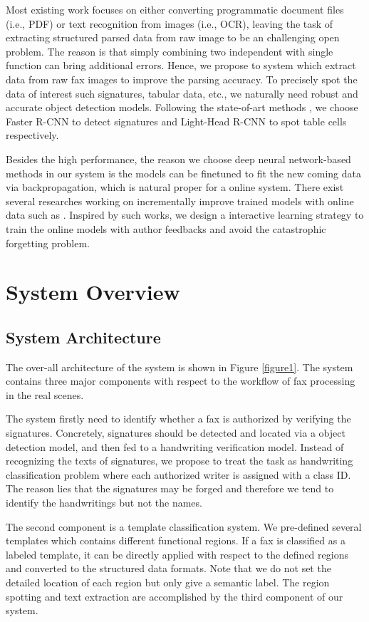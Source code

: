 \documentclass[sigconf]{acmart}
\begin{document}
Most existing work focuses on either converting programmatic document files (i.e., PDF) or text recognition from images (i.e., OCR), leaving the task of extracting structured parsed data from raw image to be an challenging open problem. The reason is that simply combining two independent with single function can bring additional errors. Hence, we propose to system which extract data from raw fax images to improve the parsing accuracy. To precisely spot the data of interest such signatures, tabular data, etc., we naturally need robust and accurate object detection models. Following the state-of-art methods \cite{ren2015faster, dai2016r, li2017light}, we choose Faster R-CNN \cite{ren2015faster} to detect signatures and Light-Head R-CNN \cite{li2017light} to spot table cells respectively.

Besides the high performance, the reason we choose deep neural network-based methods in our system is the models can be finetuned to fit the new coming data via backpropagation, which is natural proper for a online system. There exist several researches working on incrementally improve trained models with online data such as \cite{shmelkov2017incremental, su2016line}. Inspired by such works, we design a interactive learning strategy to train the online models with author feedbacks and avoid the catastrophic forgetting problem.

\section{System Overview}
\subsection{System Architecture}
The over-all architecture of the system is shown in Figure \ref{figure1}. The system contains three major components with respect to the workflow of fax processing in the real scenes.  

The system firstly need to identify whether a fax is authorized by verifying the signatures. Concretely, signatures should be detected and located via a object detection model, and then fed to a handwriting verification model. Instead of recognizing the texts of signatures, we propose to treat the task as handwriting classification problem where each authorized writer is assigned with a class ID. The reason lies that the signatures may be forged and therefore we tend to identify the handwritings but not the names. 

The second component is a template classification system. We pre-defined several templates which contains different functional regions. If a fax is classified as a labeled template, it can be directly applied with respect to the defined regions and converted to the structured data formats. Note that we do not set the detailed location of each region but only give a semantic label. The region spotting and text extraction are accomplished by the third component of our system.
\end{document}
